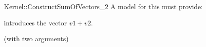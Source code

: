 \begin{ccRefFunctionObjectConcept}{Kernel::ConstructSumOfVectors_2}
A model for this must provide:


            {introduces the vector $v1 + v2$.}


\ccRefines
{} (with two arguments)

\ccSeeAlso
{}\\

\end{ccRefFunctionObjectConcept}

